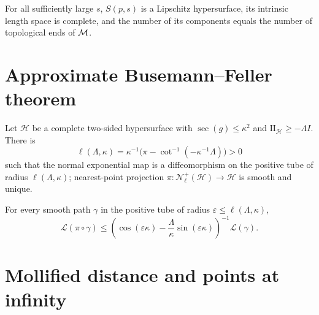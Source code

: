 \begin{proposition}
\label{prop:chow-iii-i41-large-distance-spheres}
For all sufficiently large $s$, $S(p,s)$ is a Lipschitz hypersurface, its
intrinsic length space is complete, and the number of its components equals the
number of topological ends of $\mathcal M$.
\end{proposition}

\section{Approximate Busemann--Feller theorem}

\begin{lemma}
\label{lem:chow-iii-i42-tubular-projection}
Let $\mathcal H$ be a complete two-sided hypersurface with
$\sec(g)\le\kappa^2$ and $\mathrm{II}_{\mathcal H}\ge-\Lambda I$.  There is
\[
\ell(\Lambda,\kappa)=\kappa^{-1}\bigl(\pi-\cot^{-1}(-\kappa^{-1}\Lambda)\bigr)>0
\]
such that the normal exponential map is a diffeomorphism on the positive
tube of radius $\ell(\Lambda,\kappa)$; nearest-point projection
$\pi:\mathcal N^+_{\ell}(\mathcal H)\to\mathcal H$ is smooth and unique.
\end{lemma}

\begin{theorem}
\label{thm:chow-iii-i44-approximate-busemann-feller}
For every smooth path $\gamma$ in the positive tube of radius
$\varepsilon\le\ell(\Lambda,\kappa)$,
\[
\mathcal L(\pi\circ\gamma)\le
\left(\cos(\varepsilon\kappa)-\frac\Lambda\kappa\sin(\varepsilon\kappa)\right)^{-1}
\mathcal L(\gamma).
\]
\end{theorem}

\section{Mollified distance and points at infinity}

